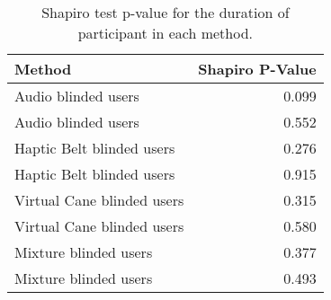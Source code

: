 
\begin{table}[!htb]
\centering
\caption{Shapiro test p-value for the duration of participant in each method.}
\label{tab:shapiro_duration}
\begin{tabular}{lr}
\toprule
                    Method &  Shapiro P-Value \\
\midrule
       Audio blinded users &            0.099 \\
       Audio blinded users &            0.552 \\
 Haptic Belt blinded users &            0.276 \\
 Haptic Belt blinded users &            0.915 \\
Virtual Cane blinded users &            0.315 \\
Virtual Cane blinded users &            0.580 \\
     Mixture blinded users &            0.377 \\
     Mixture blinded users &            0.493 \\
\bottomrule
\end{tabular}
\end{table}

